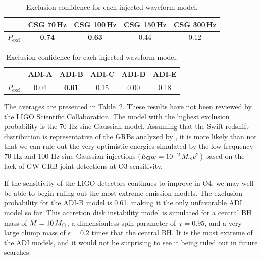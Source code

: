 \begin{table}[h]
  \hspace{0.5cm}
  \caption
  {\label{tab:grb-o3b-model-exclusion} Exclusion confidence for each injected waveform model.}
  \begin{tabular}{c c c c c}
    \hline
    \hline
    \rule{0pt}{4ex}
    & CSG 70\,Hz & CSG 100\,Hz & CSG 150\,Hz & CSG 300\,Hz \\
    \hline
    \rule[-2ex]{0pt}{4ex}
		$P_{\text{excl}}$ & \textbf{0.74} & \textbf{0.63} & 0.44 & 0.12
  \end{tabular}
  \begin{tabular}{c c c c c c}
    \hline
    \hline
    \rule{0pt}{4ex}
    & ADI-A & ADI-B & ADI-C & ADI-D & ADI-E \\
    \hline
    \rule[-2ex]{0pt}{4ex}
    $P_{\text{excl}}$ & 0.04 & \textbf{0.61} & 0.15 & 0.00 & 0.18 \\
    \hline
  \end{tabular}
\end{table}

The averages are presented in Table~\ref{tab:grb-o3b-model-exclusion}.
These results have not been reviewed by the LIGO Scientific Collaboration.
The model with the highest exclusion probability is the 70-Hz sine-Gaussian model.
Assuming that the Swift redshift distribution is representative of the GRBs analyzed by \xpip, it is more likely than not that we can rule out the very optimistic energies simulated by the low-frequency 70-Hz and 100-Hz sine-Gaussian injections ($E_{\text{GW}} = 10^{-2}\,M_{\odot} c^2$) based on the lack of GW-GRB joint detections at O3 sensitivity.

If the sensitivity of the LIGO detectors continues to improve in \ac{O4}, we may well be able to begin ruling out the most extreme emission models.
The exclusion probability for the ADI-B model is 0.61, making it the only unfavorable ADI model so far.
This accretion disk instability model is simulated for a central \ac{BH} mass of $M=10\,M_{\odot}$, a dimensionless spin parameter of $\chi=0.95$, and a very large clump mass of $\epsilon=0.2$ times that the central \ac{BH}.
It is the most extreme of the ADI models, and it would not be surprising to see it being ruled out in future searches.
